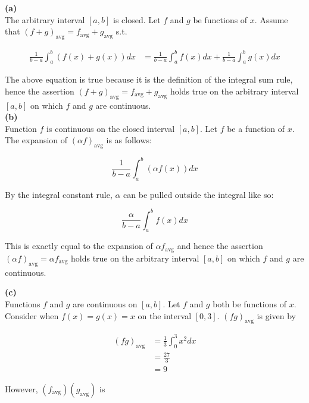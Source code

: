 \documentclass{article}
\begin{document}
    \textbf{(a)} \\
    The arbitrary interval $[a,b]$ is closed. Let $f$ and $g$ be functions of $x$. Assume that $\left(f+g\right)_{\text{avg}}=f_{\text{avg}}+g_{\text{avg}}$ s.t.

    \begin{align*}
        \frac{1}{b-a}\int_a^b \left(f(x)+g(x)\right)dx  &= \frac{1}{b-a}\int_a^b f(x)dx + \frac{1}{b-a}\int_a^b g(x)dx
    \end{align*}

    The above equation is true because it is the definition of the integral sum rule, hence the assertion $\left(f+g\right)_{\text{avg}} = f_{\text{avg}} + g_{\text{avg}}$ holds true on the arbitrary interval $[a,b]$ on
    which $f$ and $g$ are continuous. \\

    \textbf{(b)} \\
    Function $f$ is continuous on the closed interval $[a,b]$. Let $f$ be a function of $x$. The expansion of $\left(\alpha f\right)_{\text{avg}}$ is as follows:

    \[
        \frac{1}{b-a}\int_a^b (\alpha f(x))dx
    \]

    By the integral constant rule, $\alpha$ can be pulled outside the integral like so:

    \[
        \frac{\alpha}{b-a}\int_a^b f(x)dx
    \]

    This is exactly equal to the expansion of $\alpha f_{\text{avg}}$ and hence the assertion $\left(\alpha f\right)_{\text{avg}} = \alpha f_{\text{avg}}$ holds true on the arbitrary interval $[a,b]$ on which $f$ and $g$
    are continuous.



    \textbf{(c)} \\
    Functions $f$ and $g$ are continuous on $[a,b]$. Let $f$ and $g$ both be functions of $x$. Consider when $f(x)=g(x)=x$ on the interval $[0,3]$. $\left(fg\right)_{\text{avg}}$ is given by

    \pagebreak
    \thispagestyle{5}

    \begin{align*}
        (fg)_{\text{avg}} &= \frac{1}{3}\int_0^3 x^2 dx \\
                          &= \frac{27}{3} \\
                          &= 9
    \end{align*}

    However, $(f_{\text{avg}})(g_{\text{avg}})$ is
\end{document}
